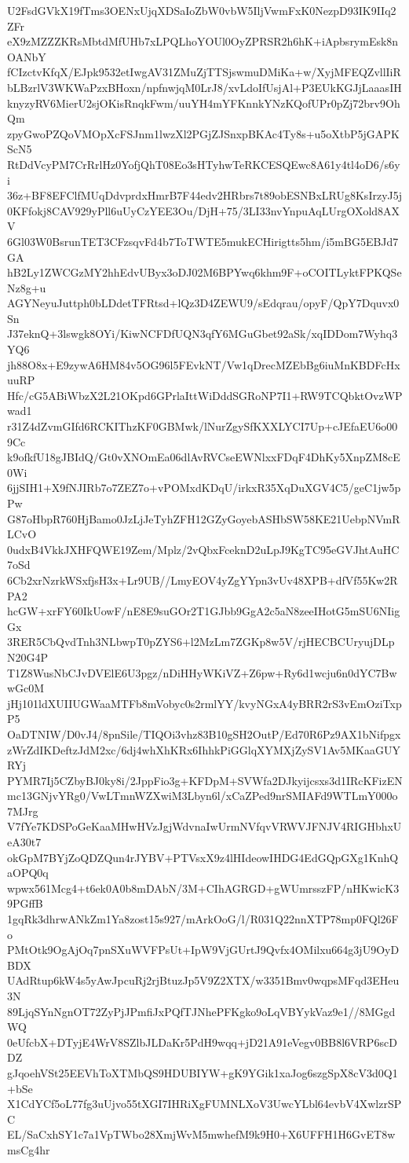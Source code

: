U2FsdGVkX19fTms3OENxUjqXDSaIoZbW0vbW5IljVwmFxK0NezpD93IK9IIq2ZFr
eX9zMZZZKRsMbtdMfUHb7xLPQLhoYOUl0OyZPRSR2h6hK+iApbsrymEsk8nOANbY
fCIzctvKfqX/EJpk9532etIwgAV31ZMuZjTTSjswmuDMiKa+w/XyjMFEQZvllIiR
bLBzrlV3WKWaPzxBHoxn/npfnwjqM0LrJ8/xvLdoIfUsjAl+P3EUkKGJjLaaasIH
knyzyRV6MierU2sjOKisRnqkFwm/uuYH4mYFKnnkYNzKQofUPr0pZj72brv9OhQm
zpyGwoPZQoVMOpXcFSJnm1lwzXl2PGjZJSnxpBKAc4Ty8s+u5oXtbP5jGAPKScN5
RtDdVcyPM7CrRrlHz0YofjQhT08Eo3sHTyhwTeRKCESQEwc8A61y4tl4oD6/s6yi
36z+BF8EFClfMUqDdvprdxHmrB7F44edv2HRbrs7t89obESNBxLRUg8KsIrzyJ5j
0KFfokj8CAV929yPll6uUyCzYEE3Ou/DjH+75/3LI33nvYnpuAqLUrgOXold8AXV
6Gl03W0BsrunTET3CFzsqvFd4b7ToTWTE5mukECHirigtts5hm/i5mBG5EBJd7GA
hB2Ly1ZWCGzMY2hhEdvUByx3oDJ02M6BPYwq6khm9F+oCOITLyktFPKQSeNz8g+u
AGYNeyuJuttph0bLDdetTFRtsd+lQz3D4ZEWU9/sEdqrau/opyF/QpY7Dquvx0Sn
J37eknQ+3lswgk8OYi/KiwNCFDfUQN3qfY6MGuGbet92aSk/xqIDDom7Wyhq3YQ6
jh88O8x+E9zywA6HM84v5OG96l5FEvkNT/Vw1qDrecMZEbBg6iuMnKBDFcHxuuRP
Hfc/cG5ABiWbzX2L21OKpd6GPrlaIttWiDddSGRoNP7I1+RW9TCQbktOvzWPwad1
r31Z4dZvmGIfd6RCKIThzKF0GBMwk/lNurZgySfKXXLYCI7Up+cJEfaEU6o009Cc
k9ofkfU18gJBIdQ/Gt0vXNOmEa06dlAvRVCseEWNlxxFDqF4DhKy5XnpZM8cE0Wi
6jjSIH1+X9fNJIRb7o7ZEZ7o+vPOMxdKDqU/irkxR35XqDuXGV4C5/geC1jw5pPw
G87oHbpR760HjBamo0JzLjJeTyhZFH12GZyGoyebASHbSW58KE21UebpNVmRLCvO
0udxB4VkkJXHFQWE19Zem/Mplz/2vQbxFceknD2uLpJ9KgTC95eGVJhtAuHC7oSd
6Cb2xrNzrkWSxfjsH3x+Lr9UB//LmyEOV4yZgYYpn3vUv48XPB+dfVf55Kw2RPA2
hcGW+xrFY60IkUowF/nE8E9suGOr2T1GJbb9GgA2c5aN8zeeIHotG5mSU6NIigGx
3RER5CbQvdTnh3NLbwpT0pZYS6+l2MzLm7ZGKp8w5V/rjHECBCUryujDLpN20G4P
T1Z8WusNbCJvDVElE6U3pgz/nDiHHyWKiVZ+Z6pw+Ry6d1wcju6n0dYC7BwwGc0M
jHj101ldXUIIUGWaaMTFb8mVobyc0s2rmlYY/kvyNGxA4yBRR2rS3vEmOziTxpP5
OaDTNIW/D0vJ4/8pnSile/TIQOi3vhz83B10gSH2OutP/Ed70R6Pz9AX1bNifpgx
zWrZdIKDeftzJdM2xc/6dj4whXhKRx6IhhkPiGGlqXYMXjZySV1Av5MKaaGUYRYj
PYMR7Ij5CZbyBJ0ky8i/2JppFio3g+KFDpM+SVWfa2DJkyijcsxs3d1IRcKFizEN
mc13GNjvYRg0/VwLTmnWZXwiM3Lbyn6l/xCaZPed9nrSMIAFd9WTLmY000o7MJrg
V7fYe7KDSPoGeKaaMHwHVzJgjWdvnaIwUrmNVfqvVRWVJFNJV4RIGHbhxUeA30t7
okGpM7BYjZoQDZQun4rJYBV+PTVsxX9z4lHIdeowIHDG4EdGQpGXg1KnhQaOPQ0q
wpwx561Mcg4+t6ek0A0b8mDAbN/3M+CIhAGRGD+gWUmrsszFP/nHKwicK39PGffB
1gqRk3dhrwANkZm1Ya8zost15s927/mArkOoG/l/R031Q22nnXTP78mp0FQl26Fo
PMtOtk9OgAjOq7pnSXuWVFPsUt+IpW9VjGUrtJ9Qvfx4OMilxu664g3jU9OyDBDX
UAdRtup6kW4s5yAwJpcuRj2rjBtuzJp5V9Z2XTX/w3351Bmv0wqpsMFqd3EHeu3N
89LjqSYnNgnOT72ZyPjJPmfiJxPQfTJNhePFKgko9oLqVBYykVaz9e1//8MGgdWQ
0eUfcbX+DTyjE4WrV8SZlbJLDaKr5PdH9wqq+jD21A91eVegv0BB8l6VRP6scDDZ
gJqoehVSt25EEVhToXTMbQS9HDUBIYW+gK9YGik1xaJog6szgSpX8cV3d0Q1+bSe
X1CdYCf5oL77fg3uUjvo55tXGI7IHRiXgFUMNLXoV3UwcYLbl64evbV4XwlzrSPC
EL/SaCxhSY1c7a1VpTWbo28XmjWvM5mwhefM9k9H0+X6UFFH1H6GvET8wmsCg4hr
